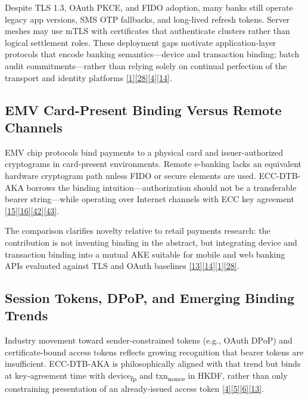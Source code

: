 \indent Despite TLS 1.3, OAuth PKCE, and FIDO adoption, many banks still operate legacy app versions, SMS OTP fallbacks, and long-lived refresh tokens. Server meshes may use mTLS with certificates that authenticate clusters rather than logical settlement roles. These deployment gaps motivate application-layer protocols that encode banking semantics---device and transaction binding; batch audit commitments---rather than relying solely on continual perfection of the transport and identity platforms \hyperref[ref:1]{[1]}\hyperref[ref:28]{[28]}\hyperref[ref:4]{[4]}\hyperref[ref:14]{[14]}.

\subsection{EMV Card-Present Binding Versus Remote Channels}

\indent EMV chip protocols bind payments to a physical card and issuer-authorized cryptograms in card-present environments. Remote e-banking lacks an equivalent hardware cryptogram path unless FIDO or secure elements are used. ECC-DTB-AKA borrows the binding intuition---authorization should not be a transferable bearer string---while operating over Internet channels with ECC key agreement \hyperref[ref:15]{[15]}\hyperref[ref:16]{[16]}\hyperref[ref:42]{[42]}\hyperref[ref:43]{[43]}.

\indent The comparison clarifies novelty relative to retail payments research: the contribution is not inventing binding in the abstract, but integrating device and transaction binding into a mutual AKE suitable for mobile and web banking APIs evaluated against TLS and OAuth baselines \hyperref[ref:13]{[13]}\hyperref[ref:14]{[14]}\hyperref[ref:1]{[1]}\hyperref[ref:28]{[28]}.

\subsection{Session Tokens, DPoP, and Emerging Binding Trends}

\indent Industry movement toward sender-constrained tokens (e.g., OAuth DPoP) and certificate-bound access tokens reflects growing recognition that bearer tokens are insufficient. ECC-DTB-AKA is philosophically aligned with that trend but binds at key-agreement time with device\textsubscript{fp} and txn\textsubscript{nonce} in HKDF, rather than only constraining presentation of an already-issued access token \hyperref[ref:4]{[4]}\hyperref[ref:5]{[5]}\hyperref[ref:6]{[6]}\hyperref[ref:13]{[13]}.

